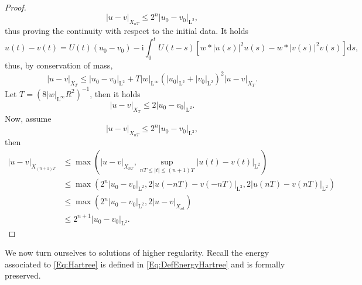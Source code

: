 \documentclass{article}
\def\R{\mathbb R}
\def\L{\mathrm L}
\def\d{\mathrm{d}}
\newtheorem{lemme}[theo]{Lemma}
\theoremstyle{definition}
\numberwithin{equation}{section}
\newcommand{\complexI}{\mathrm{i}} %
\begin{document}
\begin{proof}
    $$|u-v|_{X_{nT}}\leqslant 2^n |u_0-v_0|_{\L^2},$$
    thus proving the continuity with respect to the initial data. It holds
    $$u(t)-v(t) = U(t)(u_0-v_0)-\complexI\int_0^t U(t-s)\left[w*|u(s)|^2u(s)-w*|v(s)|^2v(s)\right]\d s,$$
    thus, by conservation of mass,
    $$|u-v|_{X_T}\leqslant |u_0-v_0|_{\L^2}+T|w|_{\L^\infty}\left(|u_0|_{\L^2}+|v_0|_{\L^2}\right)^2|u-v|_{X_T}.$$
    Let $T = \left(8|w|_{\L^\infty}R^2\right)^{-1}$, then it holds
    $$|u-v|_{X_T}\leqslant 2 |u_0-v_0|_{\L^2}.$$
    Now, assume
    $$|u-v|_{X_{nT}}\leqslant 2^n |u_0-v_0|_{\L^2},$$
    then 
    \begin{align*}
        |u-v|_{X_{(n+1)T}} &\leqslant \max\left(|u-v|_{X_{nT}},\sup_{nT\leqslant |t|\leqslant (n+1)T}|u(t)-v(t)|_{\L^2}\right)\\
        &\leqslant \max\left(2^n|u_0-v_0|_{\L^2},2|u(-nT)-v(-nT)|_{\L^2},2|u(nT)-v(nT)|_{\L^2}\right)\\
        &\leqslant \max\left(2^n|u_0-v_0|_{\L^2},2|u-v|_{X_{nt}}\right)\\
        &\leqslant 2^{n+1}|u_0-v_0|_{\L^2}.
    \end{align*}

\end{proof}


We now turn ourselves to solutions of higher regularity. Recall the energy associated to \cref{Eq:Hartree} is defined in \cref{Eq:DefEnergyHartree} and is formally preserved.

\end{document}
